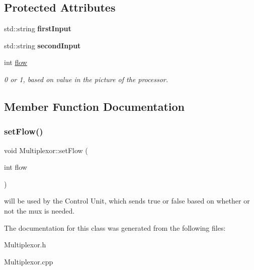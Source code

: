 \subsection*{Protected Attributes}
\begin{DoxyCompactItemize}
\item 
\mbox{\label{class_multiplexor_ae7f24f6e3b1e141c22de77520b55ff36}} 
std\+::string {\bfseries first\+Input}
\item 
\mbox{\label{class_multiplexor_aedb0534a1f3a41bd09136175a80d76b7}} 
std\+::string {\bfseries second\+Input}
\item 
\mbox{\label{class_multiplexor_aa38f2d5057c2c76b799fa66645662b55}} 
int \mbox{\hyperlink{class_multiplexor_aa38f2d5057c2c76b799fa66645662b55}{flow}}
\begin{DoxyCompactList}\small\item\em 0 or 1, based on value in the picture of the processor. \end{DoxyCompactList}\end{DoxyCompactItemize}


\subsection{Member Function Documentation}
\mbox{\label{class_multiplexor_aaf700f773d80deaa3af4cb8aec0f9b41}} 
\subsubsection{\texorpdfstring{set\+Flow()}{setFlow()}}
{\footnotesize\ttfamily void Multiplexor\+::set\+Flow (\begin{DoxyParamCaption}\item[{int}]{flow }\end{DoxyParamCaption})}

will be used by the Control Unit, which sends true or false based on whether or not the mux is needed. 

The documentation for this class was generated from the following files\+:\begin{DoxyCompactItemize}
\item 
Multiplexor.\+h\item 
Multiplexor.\+cpp\end{DoxyCompactItemize}
